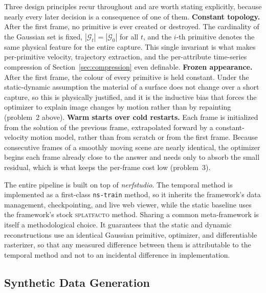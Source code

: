 Three design principles recur throughout and are worth stating explicitly, because
nearly every later decision is a consequence of one of them. \textbf{Constant topology.} After the first frame, no primitive is ever created
or destroyed. The cardinality of the Gaussian set is fixed, $|\mathcal{G}_t| =
|\mathcal{G}_0|$ for all $t$, and the $i$-th primitive denotes the same physical
feature for the entire capture. This single invariant is what makes per-primitive
velocity, trajectory extraction, and the per-attribute time-series compression of
Section~\ref{sec:compression} even definable. \textbf{Frozen appearance.} After the first frame, the colour of every primitive
is held constant. Under the static-dynamic assumption the material of a surface
does not change over a short capture, so this is physically justified, and it is
the inductive bias that forces the optimizer to explain image changes by
motion rather than by repainting (problem~2 above). \textbf{Warm starts over cold restarts.} Each frame is initialized from the
solution of the previous frame, extrapolated forward by a constant-velocity motion
model, rather than from scratch or from the first frame. Because consecutive frames
of a smoothly moving scene are nearly identical, the optimizer begins each frame
already close to the answer and needs only to absorb the small residual, which is
what keeps the per-frame cost low (problem~3).

The entire pipeline is built on top of \emph{nerfstudio}. The temporal method is
implemented as a first-class \texttt{ns-train} method, so it inherits the
framework's data management, checkpointing, and live web viewer, while the static
baseline uses the framework's stock \textsc{splatfacto} method. Sharing a common meta-framework is itself a methodological choice. It guarantees that the static and
dynamic reconstructions use an identical Gaussian primitive, optimizer, and
differentiable rasterizer, so that any measured difference between them is
attributable to the temporal method and not to an incidental difference in
implementation.

\subsection{Synthetic Data Generation}
\label{sec:data}

